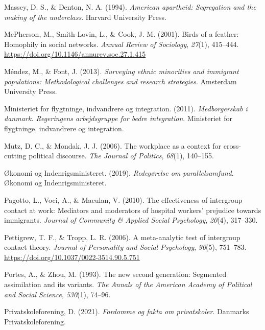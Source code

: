 \documentclass[
]{book}
\newlength{\cslhangindent}
\newenvironment{CSLReferences}[2] %
 {\begin{list}{}{%
  \setlength{\itemindent}{0pt}
  \setlength{\leftmargin}{0pt}
  \setlength{\parsep}{0pt}
  \ifodd #1
   \setlength{\leftmargin}{\cslhangindent}
   \setlength{\itemindent}{-1\cslhangindent}
  \fi
  \setlength{\itemsep}{#2\baselineskip}}}
 {\end{list}}
\begin{document}
\begin{CSLReferences}{1}{0}
Massey, D. S., \& Denton, N. A. (1994). \emph{American apartheid: Segregation and the making of the underclass}. Harvard University Press.

McPherson, M., Smith-Lovin, L., \& Cook, J. M. (2001). Birds of a feather: Homophily in social networks. \emph{Annual Review of Sociology}, \emph{27}(1), 415--444. \url{https://doi.org/10.1146/annurev.soc.27.1.415}

Méndez, M., \& Font, J. (2013). \emph{Surveying ethnic minorities and immigrant populations: Methodological challenges and research strategies}. Amsterdam University Press.

Ministeriet for flygtninge, indvandrere og integration. (2011). \emph{Medborgerskab i danmark. Regeringens arbejdsgruppe for bedre integration}. Ministeriet for flygtninge, indvandrere og integration.

Mutz, D. C., \& Mondak, J. J. (2006). The workplace as a context for cross-cutting political discourse. \emph{The Journal of Politics}, \emph{68}(1), 140--155.

Økonomi og Indenrigsministeret. (2019). \emph{Redegørelse om parallelsamfund}. {Økonomi og Indenrigsministeret}.

Pagotto, L., Voci, A., \& Maculan, V. (2010). The effectiveness of intergroup contact at work: Mediators and moderators of hospital workers' prejudice towards immigrants. \emph{Journal of Community \& Applied Social Psychology}, \emph{20}(4), 317--330.

Pettigrew, T. F., \& Tropp, L. R. (2006). A meta-analytic test of intergroup contact theory. \emph{Journal of Personality and Social Psychology}, \emph{90}(5), 751--783. \url{https://doi.org/10.1037/0022-3514.90.5.751}

Portes, A., \& Zhou, M. (1993). The new second generation: Segmented assimilation and its variants. \emph{The Annals of the American Academy of Political and Social Science}, \emph{530}(1), 74--96.

Privatskoleforening, D. (2021). \emph{Fordomme og fakta om privatskoler}. Danmarks Privatskoleforening.


\end{CSLReferences}
\end{document}
